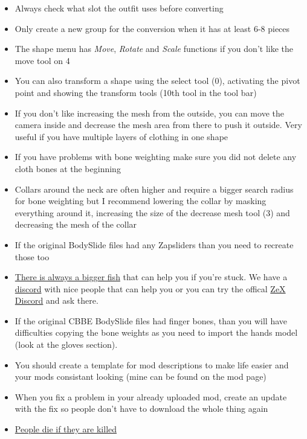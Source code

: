 \begin{itemize}
    \item Always check what slot the outfit uses before converting
    \item Only create a new group for the conversion when it has at least 6-8 pieces
    \item The shape menu has \textit{Move}, \textit{Rotate} and \textit{Scale} functions if you don't like the move tool on 4
    \item You can also transform a shape using the select tool (0), activating the pivot point and showing the transform tools 
    (10th tool in the tool bar)
    \item If you don't like increasing the mesh from the outside, you can move the camera inside and decrease the mesh area from there 
    to push it outside. Very useful if you have multiple layers of clothing in one shape
    \item If you have problems with bone weighting make sure you did not delete any cloth bones at the beginning
    \item Collars around the neck are often higher and require a bigger search radius for bone weighting but I recommend lowering the 
    collar by masking everything around it, increasing the size of the decrease mesh tool (3) and decreasing the mesh of the collar
    \item If the original BodySlide files had any Zapsliders than you need to recreate those too
    \item \href{https://www.youtube.com/watch?v=IIQVAShJzLo&t=1m15s}{There is always a bigger fish} that can help you if you're stuck.
    We have a \href{https://discord.gg/JakcQPN}{discord} with nice people that can help you or you can try the offical 
    \href{https://discord.gg/PNqYQpG}{ZeX Discord} and ask there.
    \item If the original CBBE BodySlide files had finger bones, than you will have difficulties copying the bone weights as you 
    need to import the hands model (look at the gloves section).
    \item You should create a template for mod descriptions to make life easier and your mods consistant looking (mine can be found on the mod page)
    \item When you fix a problem in your already uploaded mod, create an update with the fix so people don't have to download the whole thing again
    \item \href{https://i3.kym-cdn.com/photos/images/original/000/070/976/PEOPLE_DIE_IF_THEY_ARE_KILLED.jpg}{People die if they are killed}

\end{itemize}
